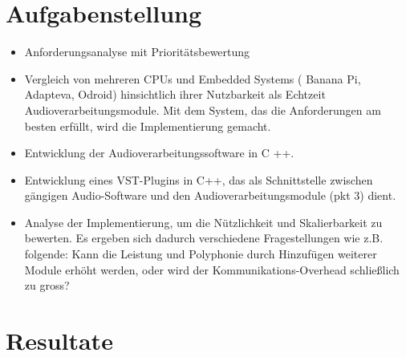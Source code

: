 \section{Aufgabenstellung}

\begin{itemize}

\item Anforderungsanalyse mit Prioritätsbewertung

\item Vergleich von mehreren CPUs und Embedded Systems ( Banana Pi, Adapteva, Odroid) hinsichtlich ihrer Nutzbarkeit als Echtzeit Audioverarbeitungsmodule. Mit dem System, das die Anforderungen am besten erfüllt, wird die Implementierung gemacht.

\item Entwicklung der Audioverarbeitungssoftware in C ++.

\item Entwicklung eines VST-Plugins in C++, das als Schnittstelle zwischen gängigen Audio-Software und den Audioverarbeitungsmodule (pkt 3) dient.

\item Analyse der Implementierung, um die Nützlichkeit und Skalierbarkeit zu bewerten. Es ergeben sich dadurch verschiedene Fragestellungen wie z.B. folgende: Kann die Leistung und Polyphonie durch Hinzufügen weiterer Module erhöht werden, oder wird der Kommunikations-Overhead schließlich zu gross?

\end{itemize}

\section{Resultate}


